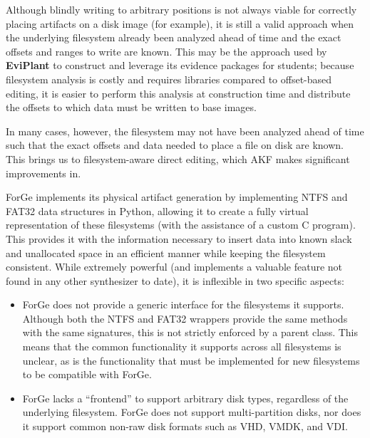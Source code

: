 \documentclass[letterpaper,12pt]{report}
\def\tightlist{}
\begin{document}
Although blindly writing to arbitrary positions is not always viable for
correctly placing artifacts on a disk image (for example), it is still a
valid approach when the underlying filesystem already been analyzed
ahead of time and the exact offsets and ranges to write are known. This
may be the approach used by \textbf{EviPlant} to construct and leverage
its evidence packages for students; because filesystem analysis is
costly and requires libraries compared to offset-based editing, it is
easier to perform this analysis at construction time and distribute the
offsets to which data must be written to base images.

In many cases, however, the filesystem may not have been analyzed ahead
of time such that the exact offsets and data needed to place a file on
disk are known. This brings us to filesystem-aware direct editing, which
AKF makes significant improvements in.

ForGe implements its physical artifact generation by implementing NTFS
and FAT32 data structures in Python, allowing it to create a fully
virtual representation of these filesystems (with the assistance of a
custom C program). This provides it with the information necessary to
insert data into known slack and unallocated space in an efficient
manner while keeping the filesystem consistent. While extremely powerful
(and implements a valuable feature not found in any other synthesizer to
date), it is inflexible in two specific aspects:

\begin{itemize}
\tightlist
\item
  ForGe does not provide a generic interface for the filesystems it
  supports. Although both the NTFS and FAT32 wrappers provide the same
  methods with the same signatures, this is not strictly enforced by a
  parent class. This means that the common functionality it supports
  across all filesystems is unclear, as is the functionality that must
  be implemented for new filesystems to be compatible with ForGe.
\item
  ForGe lacks a ``frontend'' to support arbitrary disk types, regardless
  of the underlying filesystem. ForGe does not support multi-partition
  disks, nor does it support common non-raw disk formats such as VHD,
  VMDK, and VDI.
\end{itemize}
\end{document}
